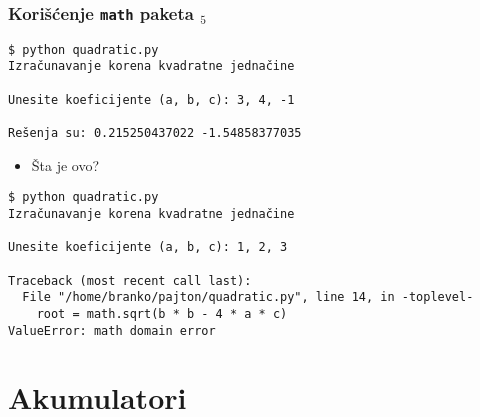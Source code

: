\documentclass[utf8,compress]{beamer}
\begin{document}
\begin{frame}[fragile,shrink=5]
  \frametitle{Korišćenje \texttt{math} paketa $_5$}
\begin{verbatim}
$ python quadratic.py
Izračunavanje korena kvadratne jednačine

Unesite koeficijente (a, b, c): 3, 4, -1

Rešenja su: 0.215250437022 -1.54858377035
\end{verbatim}
  \begin{itemize}
    \item Šta je ovo?
  \end{itemize}
\begin{verbatim}
$ python quadratic.py
Izračunavanje korena kvadratne jednačine

Unesite koeficijente (a, b, c): 1, 2, 3

Traceback (most recent call last):
  File "/home/branko/pajton/quadratic.py", line 14, in -toplevel-
    root = math.sqrt(b * b - 4 * a * c)
ValueError: math domain error
\end{verbatim}

\end{frame}


\section{Akumulatori}

\end{document}
